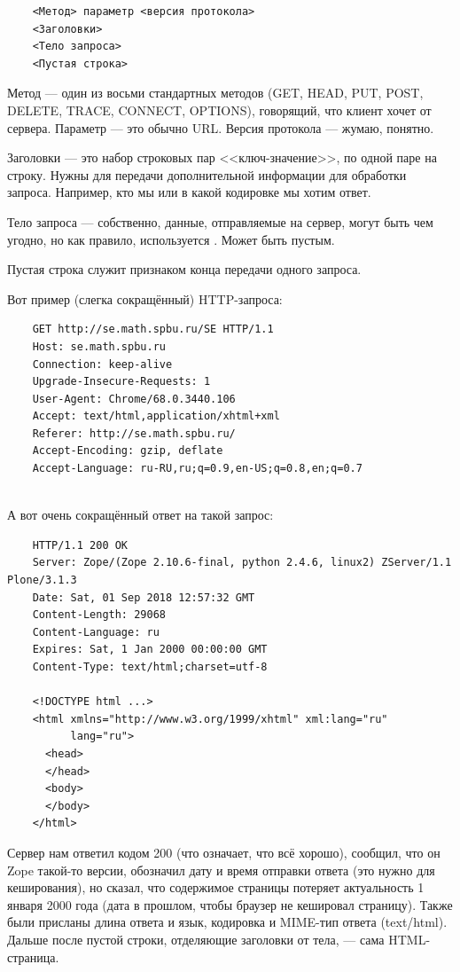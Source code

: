 \documentclass[a5paper]{article}
\begin{document}
\begin{verbatim}
    <Метод> параметр <версия протокола>
    <Заголовки>
    <Тело запроса>
    <Пустая строка>
\end{verbatim}

Метод --- один из восьми стандартных методов (GET, HEAD, PUT, POST, DELETE, TRACE, CONNECT, OPTIONS), говорящий, что клиент хочет от сервера. Параметр --- это обычно URL. Версия протокола --- жумаю, понятно.

Заголовки --- это набор строковых пар <<ключ-значение>>, по одной паре на строку. Нужны для передачи дополнительной информации для обработки запроса. Например, кто мы или в какой кодировке мы хотим ответ.

Тело запроса --- собственно, данные, отправляемые на сервер, могут быть чем угодно, но как правило, используется . Может быть пустым.

Пустая строка служит признаком конца передачи одного запроса.

Вот пример (слегка сокращённый) HTTP-запроса:

\begin{verbatim}
    GET http://se.math.spbu.ru/SE HTTP/1.1
    Host: se.math.spbu.ru
    Connection: keep-alive
    Upgrade-Insecure-Requests: 1
    User-Agent: Chrome/68.0.3440.106 
    Accept: text/html,application/xhtml+xml
    Referer: http://se.math.spbu.ru/
    Accept-Encoding: gzip, deflate
    Accept-Language: ru-RU,ru;q=0.9,en-US;q=0.8,en;q=0.7
    
\end{verbatim}

А вот очень сокращённый ответ на такой запрос:

\begin{verbatim}
    HTTP/1.1 200 OK
    Server: Zope/(Zope 2.10.6-final, python 2.4.6, linux2) ZServer/1.1 Plone/3.1.3
    Date: Sat, 01 Sep 2018 12:57:32 GMT
    Content-Length: 29068
    Content-Language: ru
    Expires: Sat, 1 Jan 2000 00:00:00 GMT
    Content-Type: text/html;charset=utf-8
    
    <!DOCTYPE html ...>
    <html xmlns="http://www.w3.org/1999/xhtml" xml:lang="ru"
          lang="ru">
      <head>
      </head>
      <body>
      </body>
    </html>
\end{verbatim}

Сервер нам ответил кодом 200 (что означает, что всё хорошо), сообщил, что он Zope такой-то версии, обозначил дату и время отправки ответа (это нужно для кеширования), но сказал, что содержимое страницы потеряет актуальность 1 января 2000 года (дата в прошлом, чтобы браузер не кешировал страницу). Также были присланы длина ответа и язык, кодировка и MIME-тип ответа (text/html). Дальше после пустой строки, отделяющие заголовки от тела, --- сама HTML-страница.
\end{document}
